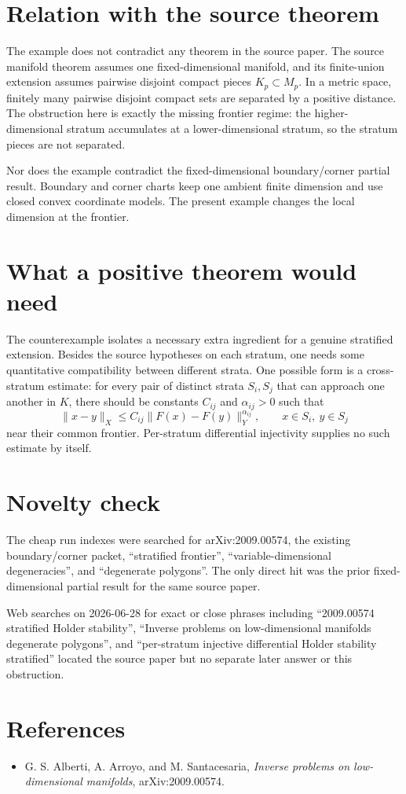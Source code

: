 \documentclass[11pt]{article}
\begin{document}
\section{Relation with the source theorem}

The example does not contradict any theorem in the source paper.  The source
manifold theorem assumes one fixed-dimensional manifold, and its finite-union
extension assumes pairwise disjoint compact pieces \(K_p\subset M_p\).  In a
metric space, finitely many pairwise disjoint compact sets are separated by a
positive distance.  The obstruction here is exactly the missing frontier
regime: the higher-dimensional stratum accumulates at a lower-dimensional
stratum, so the stratum pieces are not separated.

Nor does the example contradict the fixed-dimensional boundary/corner partial
result.  Boundary and corner charts keep one ambient finite dimension and use
closed convex coordinate models.  The present example changes the local
dimension at the frontier.

\section{What a positive theorem would need}

The counterexample isolates a necessary extra ingredient for a genuine
stratified extension.  Besides the source hypotheses on each stratum, one needs
some quantitative compatibility between different strata.  One possible form is
a cross-stratum estimate: for every pair of distinct strata \(S_i,S_j\) that can
approach one another in \(K\), there should be constants \(C_{ij}\) and
\(\alpha_{ij}>0\) such that
\[
  \|x-y\|_X\le C_{ij}\|F(x)-F(y)\|_Y^{\alpha_{ij}},
  \qquad x\in S_i,\ y\in S_j
\]
near their common frontier.  Per-stratum differential injectivity supplies no
such estimate by itself.

\section{Novelty check}

The cheap run indexes were searched for arXiv:2009.00574, the existing
boundary/corner packet, ``stratified frontier'', ``variable-dimensional
degeneracies'', and ``degenerate polygons''.  The only direct hit was the prior
fixed-dimensional partial result for the same source paper.

Web searches on 2026-06-28 for exact or close phrases including
``2009.00574 stratified Holder stability'', ``Inverse problems on
low-dimensional manifolds degenerate polygons'', and ``per-stratum injective
differential Holder stability stratified'' located the source paper but no
separate later answer or this obstruction.

\section{References}

\begin{itemize}
\item G. S. Alberti, A. Arroyo, and M. Santacesaria, \emph{Inverse problems on
  low-dimensional manifolds}, arXiv:2009.00574.
\end{itemize}
\end{document}
